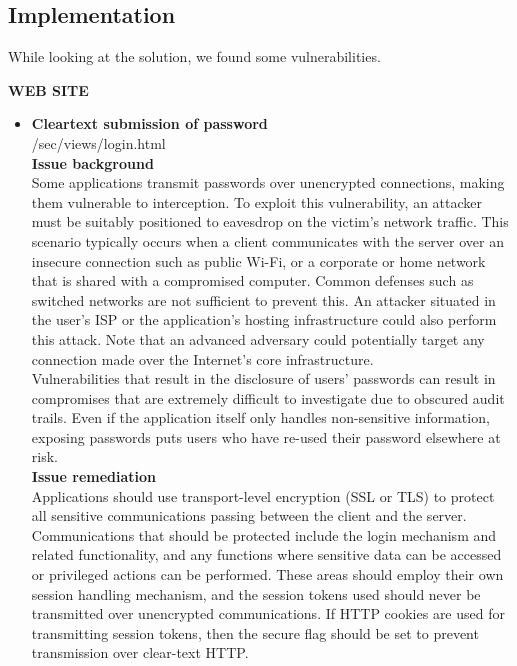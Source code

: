 \subsection{Implementation}

While looking at the solution, we found some vulnerabilities. \\

\begin{center}
\textbf{WEB SITE}
\end{center}
\begin{itemize}  
\item \textbf{Cleartext submission of password} \\
/sec/views/login.html \\

\textbf{Issue background}\\
Some applications transmit passwords over unencrypted connections, making them vulnerable to interception. To exploit this vulnerability, an attacker must be suitably positioned to eavesdrop on the victim's network traffic. This scenario typically occurs when a client communicates with the server over an insecure connection such as public Wi-Fi, or a corporate or home network that is shared with a compromised computer. Common defenses such as switched networks are not sufficient to prevent this. An attacker situated in the user's ISP or the application's hosting infrastructure could also perform this attack. Note that an advanced adversary could potentially target any connection made over the Internet's core infrastructure.\\

Vulnerabilities that result in the disclosure of users' passwords can result in compromises that are extremely difficult to investigate due to obscured audit trails. Even if the application itself only handles non-sensitive information, exposing passwords puts users who have re-used their password elsewhere at risk.\\

\textbf{Issue remediation}\\
Applications should use transport-level encryption (SSL or TLS) to protect all sensitive communications passing between the client and the server. Communications that should be protected include the login mechanism and related functionality, and any functions where sensitive data can be accessed or privileged actions can be performed. These areas should employ their own session handling mechanism, and the session tokens used should never be transmitted over unencrypted communications. If HTTP cookies are used for transmitting session tokens, then the secure flag should be set to prevent transmission over clear-text HTTP.


\end{itemize}
